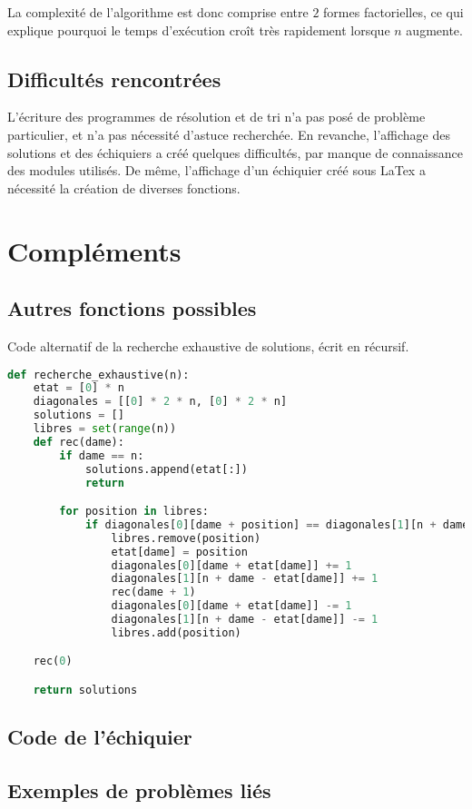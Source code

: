\documentclass[a4paper]{article}
\begin{document}
La complexité de l'algorithme est donc comprise entre $2$ formes factorielles, ce qui explique pourquoi le temps d'exécution croît très rapidement lorsque $n$ augmente.

\subsection{Difficultés rencontrées}
L'écriture des programmes de résolution et de tri n'a pas posé de problème particulier, et n'a pas nécessité d'astuce recherchée. En revanche, l'affichage des solutions et des échiquiers a créé quelques difficultés, par manque de connaissance des modules utilisés. De même, l'affichage d'un échiquier créé sous LaTex a nécessité la création de diverses fonctions.

\section{Compléments}
\subsection{Autres fonctions possibles}
Code alternatif de la recherche exhaustive de solutions, écrit en récursif.\bigskip

\begin{lstlisting}[language=Python,keywordstyle=\color{blue},stringstyle=\color{purple},commentstyle=\color{red},breaklines=true,extendedchars=true]
def recherche_exhaustive(n):
	etat = [0] * n
	diagonales = [[0] * 2 * n, [0] * 2 * n]
	solutions = []
	libres = set(range(n))
	def rec(dame):
		if dame == n:
			solutions.append(etat[:])
			return

		for position in libres:
			if diagonales[0][dame + position] == diagonales[1][n + dame - position] == 0:
				libres.remove(position)
				etat[dame] = position
				diagonales[0][dame + etat[dame]] += 1
				diagonales[1][n + dame - etat[dame]] += 1
				rec(dame + 1)
				diagonales[0][dame + etat[dame]] -= 1
				diagonales[1][n + dame - etat[dame]] -= 1
				libres.add(position)

	rec(0)

	return solutions
\end{lstlisting}

\subsection{Code de l'échiquier}
\subsection{Exemples de problèmes liés}
\end{document}
